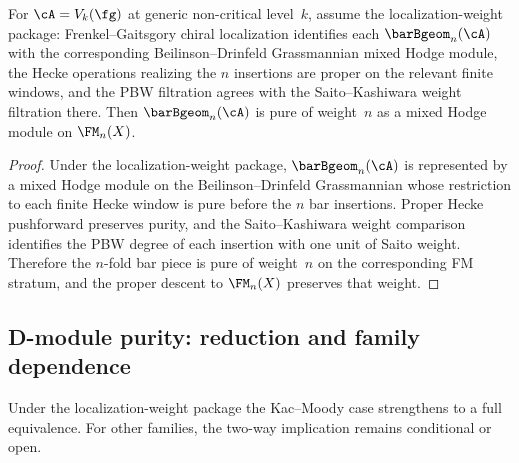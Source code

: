 \begin{proposition}
\label{prop:d-module-purity-km}
\ClaimStatusProvedHere
{}
For $\cA = V_k(\fg)$ at generic non-critical level~$k$, assume the
localization-weight package: Frenkel--Gaitsgory chiral localization
identifies each $\barBgeom_n(\cA)$ with the corresponding
Beilinson--Drinfeld Grassmannian mixed Hodge module, the Hecke
operations realizing the $n$ insertions are proper on the relevant
finite windows, and the PBW filtration agrees with the
Saito--Kashiwara weight filtration there. Then
$\barBgeom_n(\cA)$ is pure of weight~$n$ as a mixed Hodge
module on $\FM_n(X)$.
\end{proposition}

\begin{proof}
Under the localization-weight package, $\barBgeom_n(\cA)$ is represented
by a mixed Hodge module on the Beilinson--Drinfeld Grassmannian whose
restriction to each finite Hecke window is pure before the $n$ bar
insertions. Proper Hecke pushforward preserves purity, and the
Saito--Kashiwara weight comparison identifies the PBW degree of each
insertion with one unit of Saito weight. Therefore the $n$-fold bar
piece is pure of weight~$n$ on the corresponding FM stratum, and the
proper descent to $\FM_n(X)$ preserves that weight.
\end{proof}

\subsection*{D-module purity: reduction and family dependence}
\label{subsec:d-module-purity-reduction}

Under the localization-weight package the Kac--Moody case strengthens
to a full equivalence. For other families, the two-way implication
remains conditional or open.

